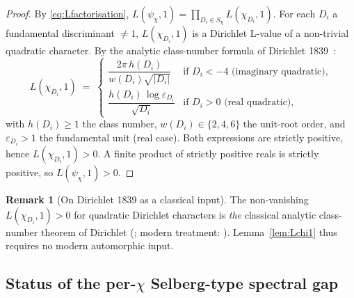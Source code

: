 \documentclass[11pt,a4paper,reqno]{amsart}
\theoremstyle{definition}
\newtheorem{remark}[theorem]{Remark}
\begin{document}
\begin{proof}
By \eqref{eq:Lfactorisation}, $L(\psi_\chi,1) = \prod_{D_i\in S_\chi} L(\chi_{D_i},1)$. For each $D_i$ a fundamental discriminant $\neq 1$, $L(\chi_{D_i},1)$ is a Dirichlet L-value of a non-trivial quadratic character. By the analytic class-number formula of Dirichlet 1839~\cite[\S6]{Davenport2000}:
\[
  L(\chi_{D_i},1) \;=\;
  \begin{cases}
    \dfrac{2\pi\, h(D_i)}{w(D_i)\sqrt{|D_i|}} & \text{if $D_i<-4$ (imaginary quadratic),} \\[0.6em]
    \dfrac{h(D_i)\,\log\varepsilon_{D_i}}{\sqrt{D_i}} & \text{if $D_i>0$ (real quadratic),}
  \end{cases}
\]
with $h(D_i)\geq 1$ the class number, $w(D_i)\in\{2,4,6\}$ the unit-root order, and $\varepsilon_{D_i}>1$ the fundamental unit (real case). Both expressions are strictly positive, hence $L(\chi_{D_i},1)>0$. A finite product of strictly positive reals is strictly positive, so $L(\psi_\chi,1)>0$.
\end{proof}

\begin{remark}[On Dirichlet 1839 as a classical input]\label{rem:Dirichlet}
The non-vanishing $L(\chi_{D_i},1)>0$ for quadratic Dirichlet characters is \emph{the} classical analytic class-number theorem of Dirichlet (\cite{Dirichlet1839}; modern treatment: \cite[\S6]{Davenport2000}). Lemma~\ref{lem:Lchi1} thus requires no modern automorphic input.
\end{remark}

\subsection{Status of the per-$\chi$ Selberg-type spectral gap}\label{ss:Selberggap}
\end{document}
